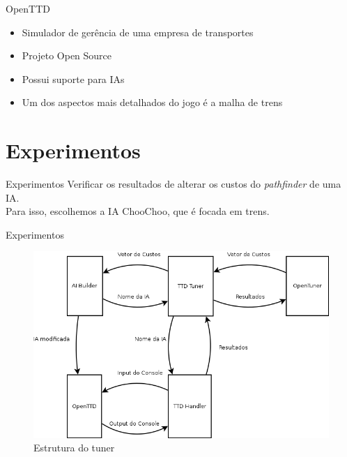 \documentclass[10pt]{beamer}
\begin{document}
\begin{frame}{OpenTTD}	
	\begin{itemize}	
		\item Simulador de gerência de uma empresa de transportes
		\item Projeto Open Source
		\item Possui suporte para IAs
		\item Um dos aspectos mais detalhados do jogo é a malha de trens
	\end{itemize}
\end{frame}

\section{Experimentos}
\begin{frame}{Experimentos}
	Verificar os resultados de alterar os custos do \textit{pathfinder} de uma IA.\\
	Para isso, escolhemos a IA ChooChoo, que é focada em trens.
\end{frame}

\begin{frame}{Experimentos}
	\begin{figure}
\centering
\includegraphics[width=1\linewidth]{Diagrama1}
\caption{Estrutura do tuner}
\label{fig:Diagrama1}
\end{figure}

\end{frame}
	
\end{document}

